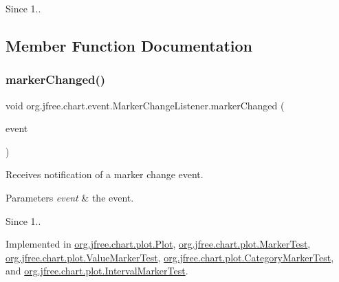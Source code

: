 \begin{DoxySince}{Since}
1.. 
\end{DoxySince}


\subsection{Member Function Documentation}
\mbox{\label{interfaceorg_1_1jfree_1_1chart_1_1event_1_1_marker_change_listener_a0797552ac12ca77a9ddd96cfe5abb60e}} 
\subsubsection{\texorpdfstring{marker\+Changed()}{markerChanged()}}
{\footnotesize\ttfamily void org.\+jfree.\+chart.\+event.\+Marker\+Change\+Listener.\+marker\+Changed (\begin{DoxyParamCaption}\item[{\mbox{\hyperlink{classorg_1_1jfree_1_1chart_1_1event_1_1_marker_change_event}{Marker\+Change\+Event}}}]{event }\end{DoxyParamCaption})}

Receives notification of a marker change event.


\begin{DoxyParams}{Parameters}
{\em event} & the event.\\
\hline
\end{DoxyParams}
\begin{DoxySince}{Since}
1.. 
\end{DoxySince}


Implemented in \mbox{\hyperlink{classorg_1_1jfree_1_1chart_1_1plot_1_1_plot_ae13294cb202d066c55a18ec96b7b7622}{org.\+jfree.\+chart.\+plot.\+Plot}}, \mbox{\hyperlink{classorg_1_1jfree_1_1chart_1_1plot_1_1_marker_test_a0bc638bd786fdd5459342de17689a75e}{org.\+jfree.\+chart.\+plot.\+Marker\+Test}}, \mbox{\hyperlink{classorg_1_1jfree_1_1chart_1_1plot_1_1_value_marker_test_a3fa1fe77ea5a55945955a0bb31672627}{org.\+jfree.\+chart.\+plot.\+Value\+Marker\+Test}}, \mbox{\hyperlink{classorg_1_1jfree_1_1chart_1_1plot_1_1_category_marker_test_aa5b6c0ae6a4ff14acf794812d66db245}{org.\+jfree.\+chart.\+plot.\+Category\+Marker\+Test}}, and \mbox{\hyperlink{classorg_1_1jfree_1_1chart_1_1plot_1_1_interval_marker_test_a04176f0b63a0fc39aa5dfcbccaed2a9b}{org.\+jfree.\+chart.\+plot.\+Interval\+Marker\+Test}}.



